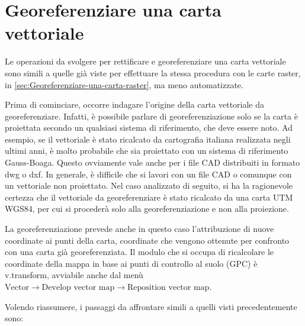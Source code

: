 			

\section{Georeferenziare una carta vettoriale}
	Le operazioni da svolgere per rettificare e georeferenziare una carta vettoriale sono simili a quelle già viste per effettuare la stessa procedura con le carte raster, in \textsection\ref{sec:Georeferenziare-una-carta-raster}, ma meno automatizzate.

	Prima di cominciare, occorre indagare l'origine della carta vettoriale da georeferenziare. Infatti, è possibile parlare di georeferenziazione solo se la carta è proiettata secondo un qualsiasi sistema di riferimento, che deve essere noto. Ad esempio, se il vettoriale è stato ricalcato da cartografia italiana realizzata negli ultimi anni, è molto probabile che sia proiettato con un sistema di riferimento Gauss-Boaga. Questo ovviamente vale anche per i file CAD distribuiti in formato dwg o dxf. In generale, è difficile che si lavori con un file CAD o comunque con un vettoriale non proiettato. Nel caso analizzato di seguito, si ha la ragionevole certezza che il vettoriale da georeferenziare è stato ricalcato da una carta UTM WGS84, per cui si procederà solo alla georeferenziazione e non alla proiezione.

	La georeferenziazione prevede anche in questo caso l'attribuzione di nuove coordinate ai punti della carta, coordinate che vengono ottenute per confronto con una carta già georeferenziata. Il modulo che si occupa di ricalcolare le coordinate della mappa in base ai punti di controllo al suolo (GPC) è \textsf{v.transform}, avviabile anche dal menù \textsf{$\text{Vector}\rightarrow\text{Develop~vector~map}\rightarrow\text{Reposition~vector~map}$}.

	Volendo riassumere, i passaggi da affrontare simili a quelli visti precedentemente sono:
	
